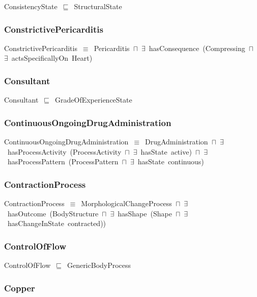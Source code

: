 \documentclass{article}
\begin{document}
ConsistencyState~\ensuremath{\sqsubseteq}~StructuralState~

\subsubsection*{ConstrictivePericarditis}

ConstrictivePericarditis~\ensuremath{\equiv}~Pericarditis~\ensuremath{\sqcap}~\ensuremath{\exists}~hasConsequence~(Compressing~\ensuremath{\sqcap}~\ensuremath{\exists}~actsSpecificallyOn~Heart)

\subsubsection*{Consultant}

Consultant~\ensuremath{\sqsubseteq}~GradeOfExperienceState~

\subsubsection*{ContinuousOngoingDrugAdministration}

ContinuousOngoingDrugAdministration~\ensuremath{\equiv}~DrugAdministration~\ensuremath{\sqcap}~\ensuremath{\exists}~hasProcessActivity~(ProcessActivity~\ensuremath{\sqcap}~\ensuremath{\exists}~hasState~active)~\ensuremath{\sqcap}~\ensuremath{\exists}~hasProcessPattern~(ProcessPattern~\ensuremath{\sqcap}~\ensuremath{\exists}~hasState~continuous)

\subsubsection*{ContractionProcess}

ContractionProcess~\ensuremath{\equiv}~MorphologicalChangeProcess~\ensuremath{\sqcap}~\ensuremath{\exists}~hasOutcome~(BodyStructure~\ensuremath{\sqcap}~\ensuremath{\exists}~hasShape~(Shape~\ensuremath{\sqcap}~\ensuremath{\exists}~hasChangeInState~contracted))

\subsubsection*{ControlOfFlow}

ControlOfFlow~\ensuremath{\sqsubseteq}~GenericBodyProcess~

\subsubsection*{Copper}
\end{document}
